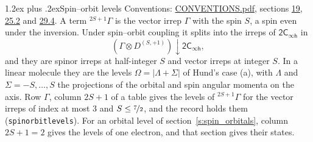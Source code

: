 \documentclass[10pt,a4paper]{article}
\makeatletter
\renewcommand\section{\@startsection{section}{1}{\z@}{-3ex plus -1ex minus -.2ex}%
  {1.2ex plus .2ex}{\normalfont\large\sffamily\bfseries\color{parttitle}}}
\numberwithin{equation}{section}
\newcommand{\grp}[1]{\mathsf{#1}}
\newcommand{\restr}[2]{#1\!\downarrow#2}
\newcommand{\irrJp}[2]{D^{(#1,#2)}}
\newcommand{\irrprod}{\otimes}
\newcommand{\term}[2]{{}^{#1}#2}
\makeatother
\begin{document}
\section{Spin--orbit levels}\label{s:spin_orbit}
Conventions: \href{../../CONVENTIONS.pdf}{CONVENTIONS.pdf}, sections \href{../../../rotation/CONVENTIONS.pdf\#conv.19}{19}, \href{../../CONVENTIONS.pdf\#conv.25.2}{25.2} and \href{../../CONVENTIONS.pdf\#conv.29.4}{29.4}.
\leavevmode\label{n:local.spin}\label{n:symbol.term}A term $\term{2S+1}{\Gamma}$ is the vector irrep $\Gamma$ with the spin $S$, a spin even under the inversion. Under spin--orbit coupling it splits into the irreps of $\grp{2C_{\infty h}}$ in
\begin{equation}\label{e:spinorbit}\restr{(\Gamma \irrprod \irrJp{S}{+1})}{\grp{2C_{\infty h}}},\end{equation}
and they are spinor irreps at half-integer $S$ and vector irreps at integer $S$. In a linear molecule they are the levels $\Omega = \lvert\Lambda + \Sigma\rvert$ of Hund's case (a), with $\Lambda$ and $\Sigma = -S, \dots, S$ the projections of the orbital and spin angular momenta on the axis. Row $\Gamma$, column $2S + 1$ of a table gives the levels of $\term{2S+1}{\Gamma}$ for the vector irreps of index at most 3 and $S \le \nicefrac{7}{2}$, and the record holds them (\texttt{spinorbitlevels}). For an orbital level of section~\ref{s:spin_orbitals}, column $2S + 1 = 2$ gives the levels of one electron, and that section gives their states.
\end{document}
